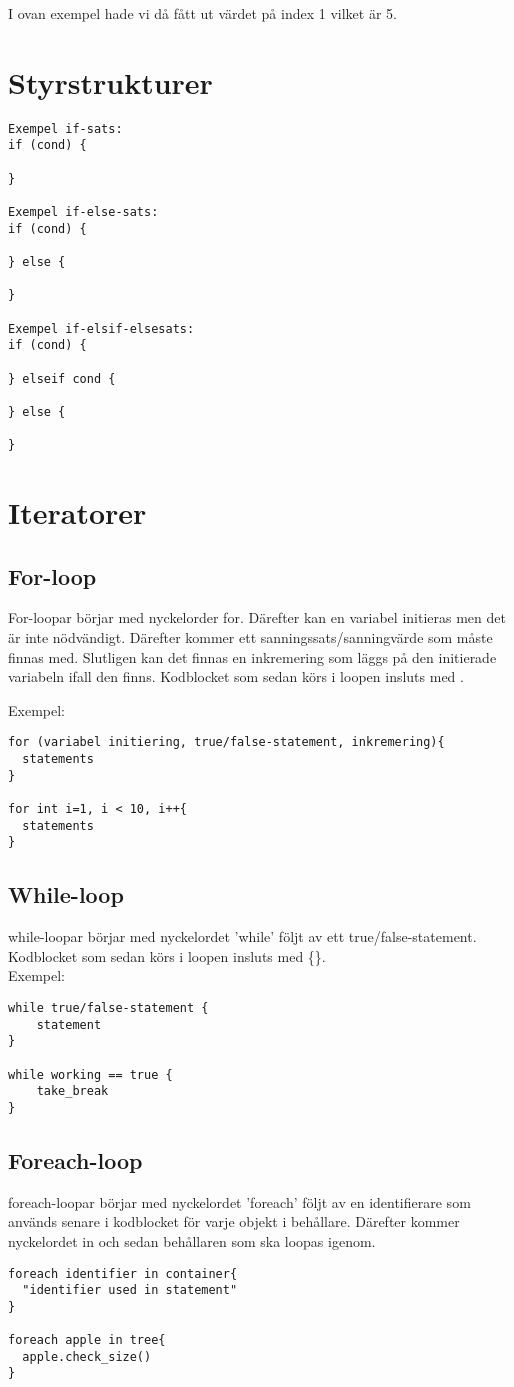 \documentclass{TDP003mall}
\begin{document}
I ovan exempel hade vi då fått ut värdet på index 1 vilket är 5.

    \section{Styrstrukturer}
\begin{verbatim}
Exempel if-sats:
if (cond) {
  
}

Exempel if-else-sats:
if (cond) {
  
} else {

}

Exempel if-elsif-elsesats:
if (cond) {
  
} elseif cond {

} else {

}
\end{verbatim}

\section{Iteratorer}

\subsection{For-loop}
For-loopar börjar med nyckelorder for. Därefter kan en variabel initieras men det är inte nödvändigt. Därefter kommer ett sanningssats/sanningvärde som måste finnas med. Slutligen kan det finnas en inkremering som läggs på den initierade variabeln ifall den finns. Kodblocket som sedan körs i loopen insluts med {}.

Exempel:
\begin{verbatim}
for (variabel initiering, true/false-statement, inkremering){
  statements
}

for int i=1, i < 10, i++{
  statements
}
\end{verbatim}
\subsection{While-loop}
while-loopar börjar med nyckelordet 'while' följt av ett true/false-statement. Kodblocket som sedan körs i loopen insluts med \{\}.\\
Exempel:
\begin{verbatim}
while true/false-statement {
    statement
}

while working == true {
    take_break
}
\end{verbatim}
\subsection{Foreach-loop}
foreach-loopar börjar med nyckelordet 'foreach' följt av en identifierare som används senare i kodblocket för varje objekt i behållare.
Därefter kommer nyckelordet in och sedan behållaren som ska loopas igenom. 
\begin{verbatim}
foreach identifier in container{
  "identifier used in statement"
}

foreach apple in tree{
  apple.check_size()
}
\end{verbatim}
\end{document}
